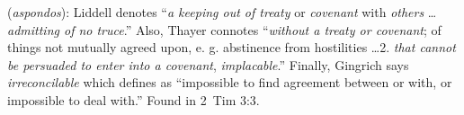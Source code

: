 \item[Irreconcilable,]

(\textit{aspondos}):
Liddell denotes ``\emph{a keeping out of treaty} or \emph{covenant} with \emph{others} \ldots \emph{admitting of no truce}.'' Also, Thayer connotes ``\emph{without a treaty or covenant}; of things not mutually agreed upon, e. g. abstinence from hostilities \ldots 2. \emph{that cannot be persuaded to enter into a covenant}, \emph{implacable}.'' Finally, Gingrich says \emph{irreconcilable} which defines as ``impossible to find agreement between or with, or impossible to deal with.''
Found in 2~Tim 3:3.
